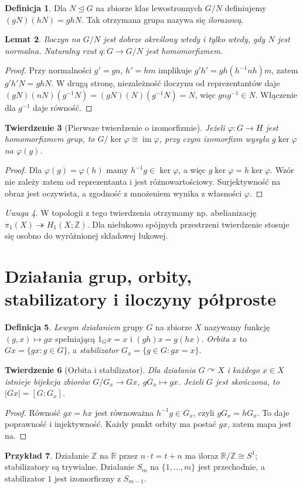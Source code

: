 \documentclass[11pt,a4paper,oneside]{report}
\newcommand{\R}{\mathbb{R}}
\newcommand{\Z}{\mathbb{Z}}
\theoremstyle{plain}
\newtheorem{twierdzenie}{Twierdzenie}[section]
\newtheorem{lemat}[twierdzenie]{Lemat}
\theoremstyle{definition}
\newtheorem{definicja}[twierdzenie]{Definicja}
\newtheorem{przyklad}[twierdzenie]{Przykład}
\theoremstyle{remark}
\newtheorem{uwaga}[twierdzenie]{Uwaga}
\begin{document}
\begin{definicja}
Dla $N\trianglelefteq G$ na zbiorze klas lewostronnych $G/N$ definiujemy
$(gN)(hN)=ghN$. Tak otrzymana grupa nazywa się \emph{ilorazową}.
\end{definicja}
\begin{lemat}
Iloczyn na $G/N$ jest dobrze określony wtedy i tylko wtedy, gdy $N$
jest normalna. Naturalny rzut $q:G\to G/N$ jest homomorfizmem.
\end{lemat}
\begin{proof}
Przy normalności $g'=gn$, $h'=hm$ implikuje
$g'h'=gh(h^{-1}nh)m$, zatem $g'h'N=ghN$. W drugą stronę,
niezależność iloczynu od reprezentantów daje
$(gN)(nN)(g^{-1}N)=(gN)(N)(g^{-1}N)=N$,
więc $gng^{-1}\in N$. Włączenie dla $g^{-1}$ daje równość.
\end{proof}
\begin{twierdzenie}[Pierwsze twierdzenie o izomorfizmie]
\label{thm:izo-grupy-v5}
Jeżeli $\varphi:G\to H$ jest homomorfizmem grup, to
$G/\ker\varphi\cong\operatorname{im}\varphi$, przy czym izomorfizm
wysyła $g\ker\varphi$ na $\varphi(g)$.
\end{twierdzenie}
\begin{proof}
Dla $\varphi(g)=\varphi(h)$ mamy $h^{-1}g\in\ker\varphi$,
a więc $g\ker\varphi=h\ker\varphi$. Wzór nie zależy zatem
od reprezentanta i jest różnowartościowy. Surjektywność na obraz
jest oczywista, a zgodność z mnożeniem wynika z własności $\varphi$.
\end{proof}
\begin{uwaga}
W topologii z tego twierdzenia otrzymamy np. abelianizację
$\pi_1(X)\twoheadrightarrow H_1(X;\Z)$. Dla niełukowo spójnych
przestrzeni twierdzenie stosuje się osobno do wyróżnionej składowej
łukowej.
\end{uwaga}

\section{Działania grup, orbity, stabilizatory i iloczyny półproste}
\begin{definicja}
\emph{Lewym działaniem} grupy $G$ na zbiorze $X$ nazywamy funkcję
$(g,x)\mapsto gx$ spełniającą $1_Gx=x$ i $(gh)x=g(hx)$.
\emph{Orbita} $x$ to $Gx=\{gx:g\in G\}$, a \emph{stabilizator}
$G_x=\{g\in G:gx=x\}$.
\end{definicja}
\begin{twierdzenie}[Orbita i stabilizator]
Dla działania $G\curvearrowright X$ i każdego $x\in X$ istnieje
bijekcja zbiorów $G/G_x\to Gx$, $gG_x\mapsto gx$.
Jeżeli $G$ jest skończona, to $|Gx|=[G:G_x]$.
\end{twierdzenie}
\begin{proof}
Równość $gx=hx$ jest równoważna $h^{-1}g\in G_x$,
czyli $gG_x=hG_x$. To daje poprawność i injektywność.
Każdy punkt orbity ma postać $gx$, zatem mapa jest na.
\end{proof}
\begin{przyklad}
Działanie $\Z$ na $\R$ przez $n\cdot t=t+n$ ma iloraz
$\R/\Z\cong S^1$; stabilizatory są trywialne.
Działanie $S_m$ na $\{1,\ldots,m\}$ jest przechodnie,
a stabilizator $1$ jest izomorficzny z $S_{m-1}$.
\end{przyklad}
\end{document}

